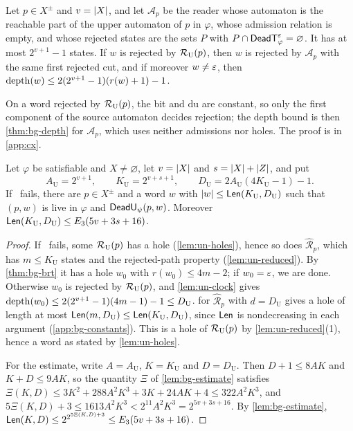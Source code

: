 \begin{lemma}\label{lem:un-clock}
Let $p\in X^\pm$ and $v=\lvert X\rvert$, and let $\mathcal A_p$ be the reader whose
automaton is the reachable part of the upper automaton of $p$ in $\varphi$,
whose admission relation is empty, and whose rejected states are the sets $P$
with $P\cap\mathsf{DeadT}^\varepsilon_\varphi=\varnothing$. It has at most $2^{v+1}-1$
states. If $w$ is rejected by $\mathcal R_{\mathrm U}(p)$, then $w$ is rejected by $\mathcal A_p$
with the same first rejected cut, and if moreover $w\ne\varepsilon$, then
$\operatorname{depth}(w)\le2(2^{v+1}-1)(r(w)+1)-1$.
\end{lemma}

On a word rejected by $\mathcal R_{\mathrm U}(p)$, the bit and $\mathrm{du}$ are constant, so only
the first component of the source automaton decides rejection; the depth bound
is then \cref{thm:bg-depth} for $\mathcal A_p$, which uses neither admissions
nor holes. The proof is in \cref{app:cx}.

\begin{proposition}\label{prop:un-sharper}
Let $\varphi$ be satisfiable and $X\ne\varnothing$, let $v=\lvert X\rvert$ and
$s=\lvert X\rvert+\lvert Z\rvert$, and put
\[
 A_{\mathrm U}=2^{v+1},\qquad K_{\mathrm U}=2^{v+s+1},\qquad
 D_{\mathrm U}=2A_{\mathrm U}(4K_{\mathrm U}-1)-1 .
\]
If \CondU\ fails, there are $p\in X^\pm$ and a word $w$ with
$\lvert w\rvert\le\mathsf{Len}(K_{\mathrm U},D_{\mathrm U})$ such that $(p,w)$ is live in
$\varphi$ and $\mathsf{DeadU}_\psi(p,w)$. Moreover
$\mathsf{Len}(K_{\mathrm U},D_{\mathrm U})\le E_3(5v+3s+16)$.
\end{proposition}

\begin{proof}
If \CondU\ fails, some $\mathcal R_{\mathrm U}(p)$ has a hole (\cref{lem:un-holes}), hence so does
$\widehat{\mathcal R}_p$, which has $m\le K_{\mathrm U}$ states and the
rejected-path property (\cref{lem:un-reduced}). By \cref{thm:bg-brt} it has a
hole $w_0$ with $r(w_0)\le4m-2$; if $w_0=\varepsilon$, we are done. Otherwise $w_0$ is
rejected by $\mathcal R_{\mathrm U}(p)$, and \cref{lem:un-clock} gives
$\operatorname{depth}(w_0)\le2(2^{v+1}-1)(4m-1)-1\le D_{\mathrm U}$. 
for $\widehat{\mathcal R}_p$ with $d=D_{\mathrm U}$ gives a hole of length at
most $\mathsf{Len}(m,D_{\mathrm U})\le\mathsf{Len}(K_{\mathrm U},D_{\mathrm U})$,
since $\mathsf{Len}$ is nondecreasing in each argument
(\cref{app:bg-constants}). This is a hole of $\mathcal R_{\mathrm U}(p)$ by
\cref{lem:un-reduced}(1), hence a word as stated by \cref{lem:un-holes}.

For the estimate, write $A=A_{\mathrm U}$, $K=K_{\mathrm U}$ and
$D=D_{\mathrm U}$. Then $D+1\le8AK$ and $K+D\le9AK$, so the quantity $\Xi$ of
\cref{lem:bg-estimate} satisfies
$\Xi(K,D)\le3K^2+288A^2K^3+3K+24AK+4\le322A^2K^3$, and
$5\Xi(K,D)+3\le1613A^2K^3<2^{11}A^2K^3=2^{5v+3s+16}$. By
\cref{lem:bg-estimate}, $\mathsf{Len}(K,D)\le2^{2^{5\Xi(K,D)+3}}\le
E_3(5v+3s+16)$.
\end{proof}

